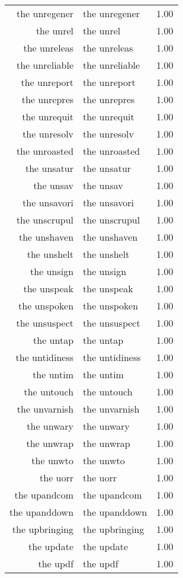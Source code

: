 \begin{table}[ht]
\begin{tabular}{rlr}
  the unregener & the unregener & 1.00 \\ 
  the unrel & the unrel & 1.00 \\ 
  the unreleas & the unreleas & 1.00 \\ 
  the unreliable & the unreliable & 1.00 \\ 
  the unreport & the unreport & 1.00 \\ 
  the unrepres & the unrepres & 1.00 \\ 
  the unrequit & the unrequit & 1.00 \\ 
  the unresolv & the unresolv & 1.00 \\ 
  the unroasted & the unroasted & 1.00 \\ 
  the unsatur & the unsatur & 1.00 \\ 
  the unsav & the unsav & 1.00 \\ 
  the unsavori & the unsavori & 1.00 \\ 
  the unscrupul & the unscrupul & 1.00 \\ 
  the unshaven & the unshaven & 1.00 \\ 
  the unshelt & the unshelt & 1.00 \\ 
  the unsign & the unsign & 1.00 \\ 
  the unspeak & the unspeak & 1.00 \\ 
  the unspoken & the unspoken & 1.00 \\ 
  the unsuspect & the unsuspect & 1.00 \\ 
  the untap & the untap & 1.00 \\ 
  the untidiness & the untidiness & 1.00 \\ 
  the untim & the untim & 1.00 \\ 
  the untouch & the untouch & 1.00 \\ 
  the unvarnish & the unvarnish & 1.00 \\ 
  the unwary & the unwary & 1.00 \\ 
  the unwrap & the unwrap & 1.00 \\ 
  the unwto & the unwto & 1.00 \\ 
  the uorr & the uorr & 1.00 \\ 
  the upandcom & the upandcom & 1.00 \\ 
  the upanddown & the upanddown & 1.00 \\ 
  the upbringing & the upbringing & 1.00 \\ 
  the update & the update & 1.00 \\ 
  the updf & the updf & 1.00 \\ 

\end{tabular}
\end{table}
